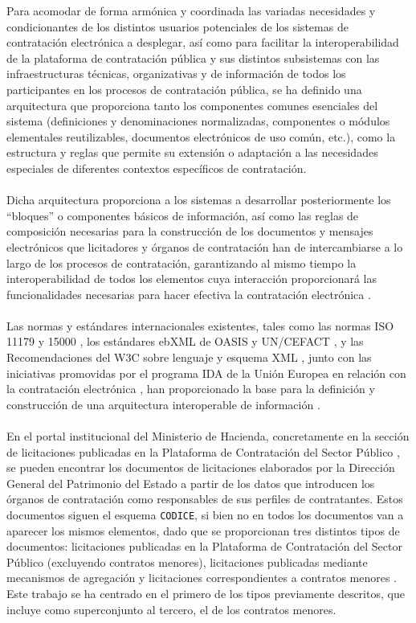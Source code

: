             \noindent Para acomodar de forma armónica y coordinada las variadas necesidades y condicionantes de los distintos usuarios potenciales de los sistemas de contratación electrónica a desplegar, así como para facilitar la interoperabilidad de la plataforma de contratación pública y sus distintos subsistemas con las infraestructuras técnicas, organizativas y de información de todos los participantes en los procesos de contratación pública, se ha definido una arquitectura \cite{CODICEIMPL} que proporciona tanto los componentes comunes esenciales del sistema (definiciones y denominaciones normalizadas, componentes o módulos elementales reutilizables, documentos electrónicos de uso común, etc.), como la estructura y reglas que permite su extensión o adaptación a las necesidades especiales de diferentes contextos específicos de contratación.
            \\ \\
            Dicha arquitectura proporciona a los sistemas a desarrollar posteriormente los “bloques” o componentes básicos de información, así como las reglas de composición necesarias para la construcción de los documentos y mensajes electrónicos que licitadores y órganos de contratación han de intercambiarse a lo largo de los procesos de contratación, garantizando al mismo tiempo la interoperabilidad de todos los elementos cuya interacción proporcionará las funcionalidades necesarias para hacer efectiva la contratación electrónica \cite{CODICEFORM}.
            \\ \\
            Las normas y estándares internacionales existentes, tales como las normas ISO 11179 \cite{ISOMDR} y 15000 \cite{ISOEBXML}, los estándares ebXML de OASIS \cite{EBXML} y UN/CEFACT \cite{UNCEFACT}, y las Recomendaciones del W3C sobre lenguaje y esquema XML \cite{XML}, junto con las iniciativas promovidas por el programa IDA de la Unión Europea en relación con la contratación electrónica \cite{UEIDA}, han proporcionado la base para la definición y construcción de una arquitectura interoperable de información \cite{CODICE}.
            \\ \\
            En el portal institucional del Ministerio de Hacienda, concretamente en la sección de licitaciones publicadas en la Plataforma de Contratación del Sector Público \cite{PORTALHAC}, se pueden encontrar los documentos de licitaciones elaborados por la Dirección General del Patrimonio del Estado a partir de los datos que introducen los órganos de contratación como responsables de sus perfiles de contratantes. Estos documentos siguen el esquema \texttt{CODICE}, si bien no en todos los documentos van a aparecer los mismos elementos, dado que se proporcionan tres distintos tipos de documentos: licitaciones publicadas en la Plataforma de Contratación del Sector Público (excluyendo contratos menores), licitaciones publicadas mediante mecanismos de agregación y licitaciones correspondientes a contratos menores \cite{CODICETIPOS}. Este trabajo se ha centrado en el primero de los tipos previamente descritos, que incluye como superconjunto al tercero, el de los contratos menores.
            
